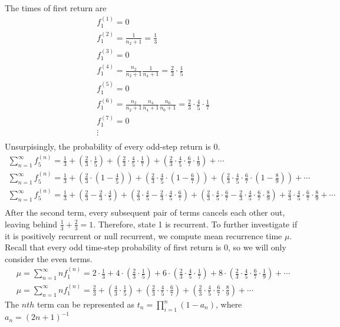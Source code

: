 The times of first return are
\begin{gather*}
f_1^{(1)} = 0 \\
f_1^{(2)} = \frac{1}{n_2+1} = \frac{1}{3} \\
f_1^{(3)} = 0 \\
f_1^{(4)} = \frac{n_2}{n_2+1}  \frac{1}{n_4+1} = \frac{2}{3}\cdot\frac{1}{5}  \\
f_1^{(5)} = 0\\
f_1^{(6)} = \frac{n_2}{n_2+1}  \frac{n_4}{n_4+1}  \frac{n_6}{n_6+1} = \frac{2}{3}\cdot\frac{4}{5}\cdot\frac{1}{7}  \\
f_1^{(7)} = 0 \\
\vdots\\
\end{gather*}
Unsurpisingly, the probability of every odd-step return is 0.
\begin{gather*}
\sum_{n=1}^{\infty}f_{5}^{(n)} = \frac{1}{3} + (\frac{2}{3}\cdot\frac{1}{5}) + (\frac{2}{3}\cdot\frac{4}{5}\cdot\frac{1}{7}) + (\frac{2}{3}\cdot\frac{4}{5}\cdot\frac{6}{7}\cdot\frac{1}{9}) + \cdots\\
\sum_{n=1}^{\infty}f_{5}^{(n)} = \frac{1}{3} + (\frac{2}{3}\cdot(1-\frac{4}{5})) + (\frac{2}{3}\cdot\frac{4}{5}\cdot(1-\frac{6}{7})) + (\frac{2}{3}\cdot\frac{4}{5}\cdot\frac{6}{7}\cdot(1-\frac{8}{9})) + \cdots\\
\sum_{n=1}^{\infty}f_{5}^{(n)} = \frac{1}{3} + (\frac{2}{3} - \frac{2}{3}\cdot\frac{4}{5}) + (\frac{2}{3}\cdot\frac{4}{5} - \frac{2}{3}\cdot\frac{4}{5}\cdot\frac{6}{7}) + (\frac{2}{3}\cdot\frac{4}{5}\cdot\frac{6}{7} - \frac{2}{3}\cdot\frac{4}{5}\cdot\frac{6}{7}\cdot\frac{8}{9}) + \frac{2}{3}\cdot\frac{4}{5}\cdot\frac{6}{7}\cdot\frac{8}{9} + \cdots\\
\end{gather*}
After the second term, every subsequent pair of terms cancels each other out, leaving behind $\frac{1}{3} + \frac{2}{3} = 1$. Therefore, state 1 is recurrent. To further investigate if it is positively recurrent or null recurrent, we compute mean recurrence time $\mu$. Recall that every odd time-step probability of first return is 0, so we will only consider the even terms.
\begin{gather*}
\mu=\sum_{n=1}^{\infty}nf_{1}^{(n)} =  2\cdot\frac{1}{3} + 4\cdot(\frac{2}{3}\cdot\frac{1}{5}) + 6\cdot(\frac{2}{3}\cdot\frac{4}{5}\cdot\frac{1}{7}) + 8\cdot(\frac{2}{3}\cdot\frac{4}{5}\cdot\frac{6}{7}\cdot\frac{1}{9}) + \cdots\\
\mu=\sum_{n=1}^{\infty}nf_{1}^{(n)} =  \frac{2}{3} + (\frac{4}{3}\cdot\frac{1}{5}) + (\frac{2}{3}\cdot\frac{4}{5}\cdot\frac{6}{7}) + (\frac{2}{3}\cdot\frac{4}{5}\cdot\frac{6}{7}\cdot\frac{8}{9}) + \cdots
\end{gather*}
The $nth$ term can be represented as $t_n = \prod_{i=1}^{n}(1-a_n)$, where $a_n = (2n+1)^{-1}$

